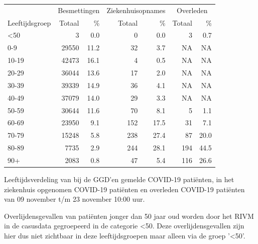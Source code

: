 \documentclass[
  english,
  man,floatsintext]{apa6}
\begin{document}
\begin{table}
\centering\begingroup\fontsize{11}{13}\selectfont

\begin{threeparttable}
\begin{tabular}{lrrrrrr}
\toprule
\multicolumn{1}{c}{ } & \multicolumn{2}{c}{Besmettingen} & \multicolumn{2}{c}{Ziekenhuisopnames} & \multicolumn{2}{c}{Overleden} \\
\cmidrule(l{3pt}r{3pt}){2-3} \cmidrule(l{3pt}r{3pt}){4-5} \cmidrule(l{3pt}r{3pt}){6-7}
Leeftijdsgroep & Totaal & \% & Totaal & \% & Totaal & \%\\
\midrule
<50 & 3 & 0.0 & 0 & 0.0 & 3 & 0.7\\
0-9 & 29550 & 11.2 & 32 & 3.7 & NA & NA\\
10-19 & 42473 & 16.1 & 4 & 0.5 & NA & NA\\
20-29 & 36044 & 13.6 & 17 & 2.0 & NA & NA\\
30-39 & 39339 & 14.9 & 36 & 4.1 & NA & NA\\
40-49 & 37079 & 14.0 & 29 & 3.3 & NA & NA\\
50-59 & 30644 & 11.6 & 70 & 8.1 & 5 & 1.1\\
60-69 & 23950 & 9.1 & 152 & 17.5 & 31 & 7.1\\
70-79 & 15248 & 5.8 & 238 & 27.4 & 87 & 20.0\\
80-89 & 7735 & 2.9 & 244 & 28.1 & 194 & 44.5\\
90+ & 2083 & 0.8 & 47 & 5.4 & 116 & 26.6\\
\bottomrule
\end{tabular}
\begin{tablenotes}
\item[1] Leeftijdsverdeling van bij de GGD’en gemelde COVID-19 patiënten, in het ziekenhuis opgenomen COVID-19 patiënten en overleden COVID-19 patiënten van 09 november t/m 23 november 10:00 uur.
\item[2] Overlijdensgevallen van patiënten jonger dan 50 jaar oud worden door het RIVM in de casusdata gegroepeerd in de categorie <50. Deze overlijdensgevallen zijn hier dus niet zichtbaar in deze leeftijdsgroepen maar alleen via de groep '<50'.
\end{tablenotes}
\end{threeparttable}
\endgroup{}
\end{table}

\newpage
\end{document}
